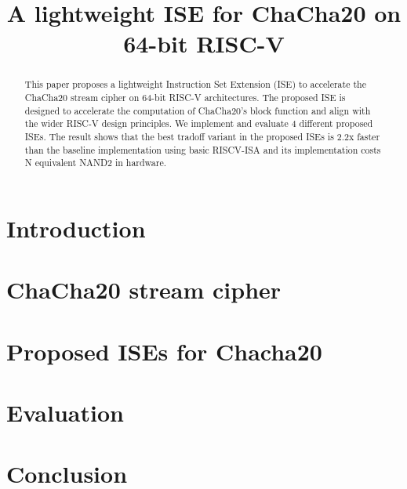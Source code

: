 \documentclass[draft]{iacrtrans}
\title{A lightweight ISE for ChaCha20 on 64-bit RISC-V}
\author{}
\begin{document}

\maketitle

\begin{abstract}
This paper proposes a lightweight Instruction Set Extension (ISE) to accelerate the ChaCha20 stream cipher on 64-bit RISC-V architectures. The proposed ISE is designed to accelerate the computation of ChaCha20's block function and align with the wider RISC-V design principles. We implement and evaluate 4 different proposed ISEs. The result shows that the best tradoff variant in the proposed ISEs is 2.2x faster than the baseline implementation using basic RISCV-ISA and its implementation costs N equivalent NAND2 in hardware.
\end{abstract}



\section{Introduction}
\label{sec:intro}


\section{ChaCha20 stream cipher}
\label{sec:bg}


\section{Proposed ISEs for Chacha20}
\label{sec:ise}


\section{Evaluation}
\label{sec:res}


\section{Conclusion}
\label{sec:outro}






\end{document}
